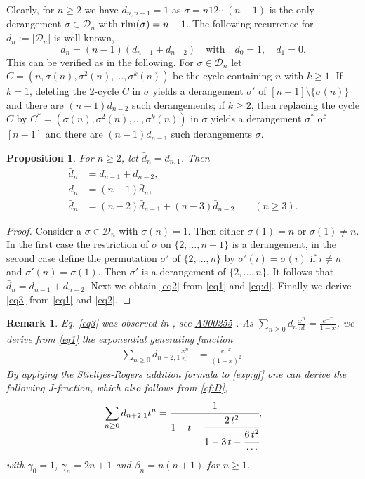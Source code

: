 \documentclass[12pt,reqno]{amsart}
\numberwithin{equation}{section}
\def\D{\mathcal{D}}
\def\rlm{\mathop{\rm rlm}}
\newtheorem{prop}{Proposition}
\newtheorem{rem}{Remark}
\begin{document}
Clearly, for $n\geq 2$ we have $d_{n,n-1}=1$ as
$\sigma=n 1 2 \cdots (n-1)$ is the only derangement $\sigma\in \D_n$ with  $\rlm(\sigma)= n-1$.  
The following recurrence  for $d_n:=|\D_n|$ is well-known, 
\begin{equation}\label{eq:d}
	d_n=(n-1)\left(d_{n-1}+d_{n-2}\right)\quad \textrm{with} \quad d_0=1,\quad d_1=0.
\end{equation}
This can be verified as in the following.
For $\sigma\in \D_n$ let $C=(n, \sigma(n), \sigma^2(n),\ldots, \sigma^{k}(n))$ be  the cycle containing $n$ with $k\geq 1$. 
If $k=1$, 
deleting the 2-cycle $C$  in $\sigma$ yields a derangement $\sigma'$  
of $[n-1]\setminus \{\sigma(n)\}$  
and there are $(n-1)d_{n-2}$ such derangements; 
if $k\geq 2$,  then replacing the cycle $C$ by $C^*=(\sigma(n), \sigma^2(n),\ldots, \sigma^{k}(n))$ in $\sigma$  yields  a derangement $\sigma^*$ of $[n-1]$ and 
there are $(n-1)d_{n-1}$ such derangements $\sigma$.

\begin{prop}
	For $n\geq 2$,
	let $\bar d_n=d_{n,1}$. 
	Then
	\begin{align}
		\bar d_n&=d_{n-1}+d_{n-2},\label{eq1}\\
		d_n&=(n-1)\bar d_{n},\label{eq2}\\
		\bar d_n&=(n-2)\bar d_{n-1}+(n-3)\bar d_{n-2} \qquad (n\geq 3)\label{eq3}. 
	\end{align}
\end{prop}
\begin{proof}
	Consider a $\sigma\in \D_n$ with  $\sigma(n)=1$.
	Then either $\sigma(1)=n$ or $\sigma(1)\neq n$. In the first case 
	the restriction of $\sigma$ on $\{2, \ldots, n-1\}$ is a derangement, in the second case define the permutation $\sigma'$ of $\{2, \ldots, n\}$  by
	$\sigma'(i)=\sigma(i)$ if $i\neq n$ and $\sigma'(n)=\sigma(1)$. Then 
	$\sigma'$ is a derangement  of $\{2, \ldots, n\}$. It follows that $\bar d_n=d_{n-1}+d_{n-2}$. Next we obtain \eqref{eq2} from \eqref{eq1} and \eqref{eq:d}. Finally we derive \eqref{eq3} from \eqref{eq1} and \eqref{eq2}.
\end{proof}
\begin{rem}
Eq. \eqref{eq3} was observed in \cite[Section 5.3]{AG21}, see \href{http://oeis.org/A000255}{A000255} \cite{Sl19}.
	As  $\sum_{n\geq 0}d_n \frac{x^n}{n!}=\frac{e^{-x}}{1-x}$,
	we derive from \eqref{eq1} the exponential generating function
\begin{align}\label{exp:gf}
		\sum_{n\geq 0} d_{n+2,1} \frac{x^n}{n!}&=\frac{e^{-x}}{(1-x)^2}.
	\end{align}
	By applying  the Stieltjes-Rogers addition formula to \eqref{exp:gf} one can derive the following J-fraction, which also follows from  \eqref{cf:D},
	\begin{align}\label{CF:dn1}
		\sum_{n\geq 0} d_{n+2,1} t^n=\cfrac{1}{1- t-\cfrac{2\, t^2}
			{1-3\, t-\cfrac{6\, t^2}{\cdots}}},
	\end{align}
	with $\gamma_0=1$, $\gamma_n=2n+1$ and $\beta_n=n(n+1)$ for $n\geq 1$.

\end{rem}
\end{document}
